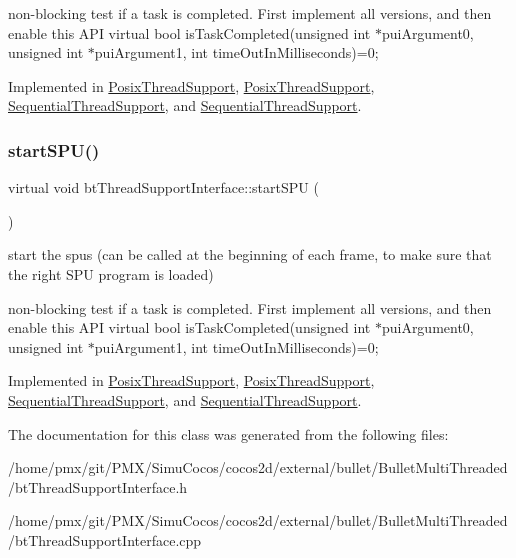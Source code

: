 non-\/blocking test if a task is completed. First implement all versions, and then enable this A\+PI virtual bool is\+Task\+Completed(unsigned int $\ast$pui\+Argument0, unsigned int $\ast$pui\+Argument1, int time\+Out\+In\+Milliseconds)=0; 

Implemented in \hyperlink{classPosixThreadSupport_a937bbc2c359429b0f0c1d9514ab150eb}{Posix\+Thread\+Support}, \hyperlink{classPosixThreadSupport_ac9816781a7ba8230694a6376ae1211a6}{Posix\+Thread\+Support}, \hyperlink{classSequentialThreadSupport_aae3626fe6fc67d14c0759712b3a0b5b2}{Sequential\+Thread\+Support}, and \hyperlink{classSequentialThreadSupport_afc75495b1786473811defc9bbbbb720b}{Sequential\+Thread\+Support}.

\mbox{\label{classbtThreadSupportInterface_a4d5139ae58302c0509c309ba9f3d2ca3}} 
\subsubsection{\texorpdfstring{start\+S\+P\+U()}{startSPU()}\hspace{0.1cm}{\footnotesize\ttfamily [2/2]}}
{\footnotesize\ttfamily virtual void bt\+Thread\+Support\+Interface\+::start\+S\+PU (\begin{DoxyParamCaption}{ }\end{DoxyParamCaption})\hspace{0.3cm}{\ttfamily [pure virtual]}}



start the spus (can be called at the beginning of each frame, to make sure that the right S\+PU program is loaded) 

non-\/blocking test if a task is completed. First implement all versions, and then enable this A\+PI virtual bool is\+Task\+Completed(unsigned int $\ast$pui\+Argument0, unsigned int $\ast$pui\+Argument1, int time\+Out\+In\+Milliseconds)=0; 

Implemented in \hyperlink{classPosixThreadSupport_a937bbc2c359429b0f0c1d9514ab150eb}{Posix\+Thread\+Support}, \hyperlink{classPosixThreadSupport_ac9816781a7ba8230694a6376ae1211a6}{Posix\+Thread\+Support}, \hyperlink{classSequentialThreadSupport_aae3626fe6fc67d14c0759712b3a0b5b2}{Sequential\+Thread\+Support}, and \hyperlink{classSequentialThreadSupport_afc75495b1786473811defc9bbbbb720b}{Sequential\+Thread\+Support}.



The documentation for this class was generated from the following files\+:\begin{DoxyCompactItemize}
\item 
/home/pmx/git/\+P\+M\+X/\+Simu\+Cocos/cocos2d/external/bullet/\+Bullet\+Multi\+Threaded/bt\+Thread\+Support\+Interface.\+h\item 
/home/pmx/git/\+P\+M\+X/\+Simu\+Cocos/cocos2d/external/bullet/\+Bullet\+Multi\+Threaded/bt\+Thread\+Support\+Interface.\+cpp\end{DoxyCompactItemize}

